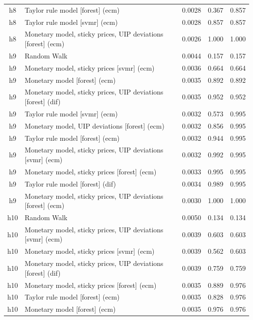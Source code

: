 \begin{ThreePartTable}
\begin{longtable}[t]{cp{5.5cm}ccc}
h8 & \raggedright Taylor rule model [forest] (ecm) & 0.0028 & 0.367 & 0.857\\
h8 & \raggedright Taylor rule model [svmr] (ecm) & 0.0028 & 0.857 & 0.857\\
h8 & \raggedright Monetary model, sticky prices, UIP deviations [forest] (ecm) & 0.0026 & 1.000 & 1.000\\
\addlinespace
h9 & \raggedright Random Walk & 0.0044 & 0.157 & 0.157\\
h9 & \raggedright Monetary model, sticky prices [svmr] (ecm) & 0.0036 & 0.664 & 0.664\\
h9 & \raggedright Monetary model [forest] (ecm) & 0.0035 & 0.892 & 0.892\\
h9 & \raggedright Monetary model, sticky prices, UIP deviations [forest] (dif) & 0.0035 & 0.952 & 0.952\\
h9 & \raggedright Taylor rule model [svmr] (ecm) & 0.0032 & 0.573 & 0.995\\
h9 & \raggedright Monetary model, UIP deviations [forest] (ecm) & 0.0032 & 0.856 & 0.995\\
h9 & \raggedright Taylor rule model [forest] (ecm) & 0.0032 & 0.944 & 0.995\\
h9 & \raggedright Monetary model, sticky prices, UIP deviations [svmr] (ecm) & 0.0032 & 0.992 & 0.995\\
h9 & \raggedright Monetary model, sticky prices [forest] (ecm) & 0.0033 & 0.995 & 0.995\\
h9 & \raggedright Taylor rule model [forest] (dif) & 0.0034 & 0.989 & 0.995\\
h9 & \raggedright Monetary model, sticky prices, UIP deviations [forest] (ecm) & 0.0030 & 1.000 & 1.000\\
\addlinespace
h10 & \raggedright Random Walk & 0.0050 & 0.134 & 0.134\\
h10 & \raggedright Monetary model, sticky prices, UIP deviations [svmr] (ecm) & 0.0039 & 0.603 & 0.603\\
h10 & \raggedright Monetary model, sticky prices [svmr] (ecm) & 0.0039 & 0.562 & 0.603\\
h10 & \raggedright Monetary model, sticky prices, UIP deviations [forest] (dif) & 0.0039 & 0.759 & 0.759\\
h10 & \raggedright Monetary model, sticky prices [forest] (ecm) & 0.0035 & 0.889 & 0.976\\
h10 & \raggedright Taylor rule model [forest] (ecm) & 0.0035 & 0.828 & 0.976\\
h10 & \raggedright Monetary model [forest] (ecm) & 0.0035 & 0.976 & 0.976\\

\end{longtable}
\end{ThreePartTable}
